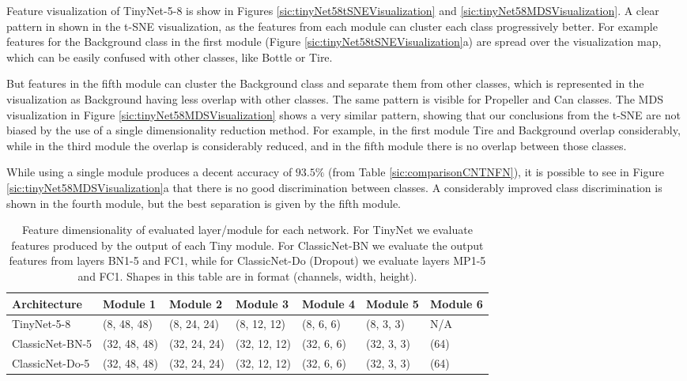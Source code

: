Feature visualization of TinyNet-5-8 is show in Figures \ref{sic:tinyNet58tSNEVisualization} and \ref{sic:tinyNet58MDSVisualization}. A clear pattern in shown in the t-SNE visualization, as the features from each module can cluster each class progressively better. For example features for the Background class in the first module (Figure \ref{sic:tinyNet58tSNEVisualization}a) are spread over the visualization map, which can be easily confused with other classes, like Bottle or Tire.

But features in the fifth module can cluster the Background class and separate them from other classes, which is represented in the visualization as Background having less overlap with other classes. The same pattern is visible for Propeller and Can classes.
The MDS visualization in Figure \ref{sic:tinyNet58MDSVisualization} shows a very similar pattern, showing that our conclusions from the t-SNE are not biased by the use of a single dimensionality reduction method. For example, in the first module Tire and Background overlap considerably, while in the third module the overlap is considerably reduced, and in the fifth module there is no overlap between those classes.

While using a single module produces a decent accuracy of $93.5 \%$ (from Table \ref{sic:comparisonCNTNFN}), it is possible to see in Figure \ref{sic:tinyNet58MDSVisualization}a that there is no good discrimination between classes. A considerably improved class discrimination is shown in the fourth module, but the best separation is given by the fifth module.

\begin{table*}[t]
	\begin{tabular}{lllllll}
		\hline
		Architecture	& Module 1 		& Module 2 		& Module 3 		& Module 4 	& Module 5   & Module 6\\
		\hline
		TinyNet-5-8				& (8, 48, 48) 	& (8, 24, 24)	& (8, 12, 12)	& (8, 6, 6)	& (8, 3, 3)	  & N/A\\		
		\hline
		ClassicNet-BN-5			& (32, 48, 48)  & (32, 24, 24)  & (32, 12, 12)  & (32, 6, 6) & (32, 3, 3) & (64)\\
		ClassicNet-Do-5	& (32, 48, 48)  & (32, 24, 24)  & (32, 12, 12)  & (32, 6, 6) & (32, 3, 3) & (64)\\
		\hline
	\end{tabular}
	\vspace*{0.5cm}
	\caption[Feature dimensionality of evaluated layer/module for each network]{Feature dimensionality of evaluated layer/module for each network. For TinyNet we evaluate features produced by the output of each Tiny module. For ClassicNet-BN we evaluate the output features from layers BN1-5 and FC1, while for ClassicNet-Do (Dropout) we evaluate layers MP1-5 and FC1. Shapes in this table are in format (channels, width, height).}
	\label{sic:featureDimensions}
\end{table*}


